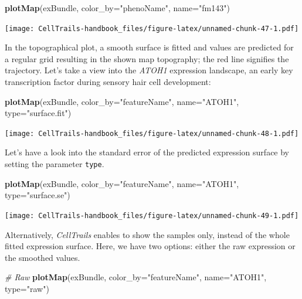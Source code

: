 \documentclass[]{book}
\newenvironment{Shaded}{\begin{snugshade}}{\end{snugshade}}
\newcommand{\KeywordTok}[1]{\textcolor[rgb]{0.13,0.29,0.53}{\textbf{#1}}}
\newcommand{\DataTypeTok}[1]{\textcolor[rgb]{0.13,0.29,0.53}{#1}}
\newcommand{\StringTok}[1]{\textcolor[rgb]{0.31,0.60,0.02}{#1}}
\newcommand{\CommentTok}[1]{\textcolor[rgb]{0.56,0.35,0.01}{\textit{#1}}}
\newcommand{\NormalTok}[1]{#1}
\theoremstyle{definition}
\theoremstyle{definition}
\theoremstyle{definition}
\theoremstyle{remark}
\begin{document}
\begin{Shaded}
\begin{Highlighting}[]
\KeywordTok{plotMap}\NormalTok{(exBundle, }\DataTypeTok{color_by=}\StringTok{"phenoName"}\NormalTok{, }\DataTypeTok{name=}\StringTok{"fm143"}\NormalTok{)}
\end{Highlighting}
\end{Shaded}

\texttt{[image: CellTrails-handbook\_files/figure-latex/unnamed-chunk-47-1.pdf]}

In the topographical plot, a smooth surface is fitted and values are
predicted for a regular grid resulting in the shown map topography; the
red line signifies the trajectory. Let's take a view into the
\emph{ATOH1} expression landscape, an early key transcription factor
during sensory hair cell development:

\begin{Shaded}
\begin{Highlighting}[]
\KeywordTok{plotMap}\NormalTok{(exBundle, }\DataTypeTok{color_by=}\StringTok{"featureName"}\NormalTok{, }\DataTypeTok{name=}\StringTok{"ATOH1"}\NormalTok{, }\DataTypeTok{type=}\StringTok{"surface.fit"}\NormalTok{)}
\end{Highlighting}
\end{Shaded}

\texttt{[image: CellTrails-handbook\_files/figure-latex/unnamed-chunk-48-1.pdf]}

Let's have a look into the standard error of the predicted expression
surface by setting the parameter \texttt{type}.

\begin{Shaded}
\begin{Highlighting}[]
\KeywordTok{plotMap}\NormalTok{(exBundle, }\DataTypeTok{color_by=}\StringTok{"featureName"}\NormalTok{, }\DataTypeTok{name=}\StringTok{"ATOH1"}\NormalTok{, }\DataTypeTok{type=}\StringTok{"surface.se"}\NormalTok{)}
\end{Highlighting}
\end{Shaded}

\texttt{[image: CellTrails-handbook\_files/figure-latex/unnamed-chunk-49-1.pdf]}

Alternatively, \emph{CellTrails} enables to show the samples only,
instead of the whole fitted expression surface. Here, we have two
options: either the raw expression or the smoothed values.

\begin{Shaded}
\begin{Highlighting}[]
\CommentTok{# Raw}
\KeywordTok{plotMap}\NormalTok{(exBundle, }\DataTypeTok{color_by=}\StringTok{"featureName"}\NormalTok{, }\DataTypeTok{name=}\StringTok{"ATOH1"}\NormalTok{, }\DataTypeTok{type=}\StringTok{"raw"}\NormalTok{)}
\end{Highlighting}
\end{Shaded}
\end{document}
